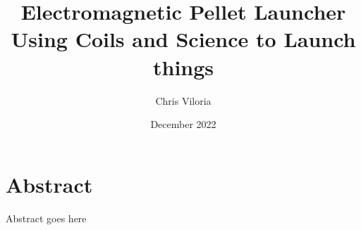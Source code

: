 \documentclass{report}
\title{{\myfont Electromagnetic Pellet Launcher\\
	{\Large Using Coils and Science to Launch things}}}
\author{Chris Viloria}
\date{December 2022}
\begin{document}
\maketitle
\chapter*{Abstract}
	Abstract goes here
	

\end{document}
